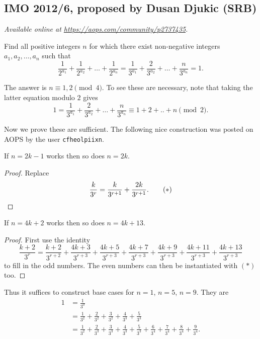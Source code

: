 \documentclass[11pt]{scrartcl}
\begin{document}
\subsection{IMO 2012/6, proposed by Dusan Djukic (SRB)}
\textsl{Available online at \url{https://aops.com/community/p2737435}.}
\begin{mdframed}[style=mdpurplebox,frametitle={Problem statement}]
Find all positive integers $n$
for which there exist non-negative integers $a_1, a_2, \dots, a_n$
such that
\[ \frac{1}{2^{a_1}} + \frac{1}{2^{a_2}} + \dots + \frac{1}{2^{a_n}}
  = \frac{1}{3^{a_1}} + \frac{2}{3^{a_2}} + \dots + \frac{n}{3^{a_n}}
  = 1. \]
\end{mdframed}
The answer is $n \equiv 1, 2 \pmod 4$.
To see these are necessary,
note that taking the latter equation modulo $2$ gives
\[ 1 = \frac{1}{3^{a_1}} + \frac{2}{3^{a_2}} + \dots + \frac{n}{3^{a_n}}
\equiv 1 + 2 + .. + n \pmod 2. \]

Now we prove these are sufficient.
The following nice construction was posted on AOPS
by the user \texttt{cfheolpiixn}.

\begin{claim*}
  If $n = 2k-1$ works then so does $n = 2k$.
\end{claim*}
\begin{proof}
  Replace
  \[ \frac{k}{3^r} = \frac{k}{3^{r+1}} + \frac{2k}{3^{r+1}}.
    \qquad(\ast) \qedhere \]
\end{proof}

\begin{claim*}
  If $n = 4k+2$ works then so does $n = 4k + 13$.
\end{claim*}
\begin{proof}
  First use the identity
  \[
    \frac{k+2}{3^r} = \frac{k+2}{3^{r+2}}
    + \frac{4k+ 3}{3^{r+3}}
    + \frac{4k+ 5}{3^{r+3}}
    + \frac{4k+ 7}{3^{r+3}}
    + \frac{4k+ 9}{3^{r+3}}
    + \frac{4k+11}{3^{r+3}}
    + \frac{4k+13}{3^{r+3}}
  \]
  to fill in the odd numbers.
  The even numbers can then be instantiated with $(\ast)$ too.
\end{proof}

Thus it suffices to construct base cases
for $n = 1$, $n = 5$, $n = 9$.
They are
\begin{align*}
  1 &= \frac{1}{3^0} \\
  &= \frac{1}{3^2} + \frac{2}{3^2} + \frac{3}{3^2}
    + \frac{4}{3^3} + \frac{5}{3^3} \\
  &= \frac{1}{3^2} + \frac{2}{3^3} + \frac{3}{3^3}
  + \frac{4}{3^3} + \frac{5}{3^3} + \frac{6}{3^4}
  + \frac{7}{3^4} + \frac{8}{3^4} + \frac{9}{3^4}.
\end{align*}
\pagebreak
\end{document}
